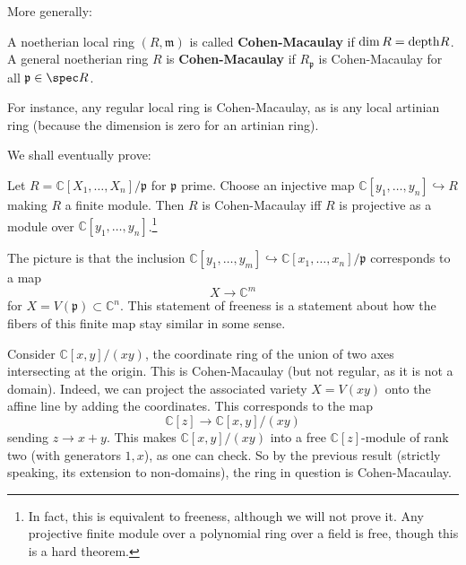More generally:
\begin{definition} 
A noetherian local ring $(R, \mathfrak{m})$ is called \textbf{Cohen-Macaulay}
if $\dim R = \mathrm{depth} R$. A general noetherian ring $R$ is \textbf{Cohen-Macaulay} if
$R_{\mathfrak{p}}$ is Cohen-Macaulay for all $\mathfrak{p} \in \spec R$.
\end{definition} 
For instance, any regular local ring is Cohen-Macaulay, as is any local
artinian ring (because the dimension is zero for an artinian ring).

We shall eventually prove:

\begin{proposition} 
Let $R = \mathbb{C}[X_1, \dots, X_n]/\mathfrak{p}$ for $\mathfrak{p}$ prime.
Choose an injective map $\mathbb{C}[y_1, \dots, y_n] \hookrightarrow R$ making $R$ a
finite module. Then $R$ is Cohen-Macaulay iff $R$ is projective as a module
over $\mathbb{C}[y_1, \dots, y_n]$.\footnote{In fact, this is equivalent to
freeness, although we will not prove it. Any projective finite module over a
polynomial ring over a field is free, though this is a hard theorem.}
\end{proposition} 

The picture is that the inclusion $\mathbb{C}[y_1, \dots, y_m ] \hookrightarrow
\mathbb{C}[x_1, \dots, x_n]/\mathfrak{p}$ corresponds to a map 
\[ X \to \mathbb{C}^m  \]
for $X = V(\mathfrak{p}) \subset \mathbb{C}^n$. This statement of freeness is a
statement about how the fibers of this finite map stay similar in some sense.

\begin{example} 
Consider $\mathbb{C}[x,y]/(xy)$, the coordinate ring of the union of two axes
intersecting at the origin. This is Cohen-Macaulay (but not regular, as it
is not a domain). Indeed, we can project the associated variety $X = V(xy)$
onto the affine line by adding the coordinates. This corresponds to the map
\[ \mathbb{C}[z] \to \mathbb{C}[x,y]/(xy)  \]
sending $z \to x+y$. This makes $\mathbb{C}[x,y]/(xy)$ into a free
$\mathbb{C}[z]$-module of rank two (with generators $1, x$), as one can check.
So by the previous result (strictly speaking, its extension to non-domains),
the ring in question is Cohen-Macaulay.
\end{example} 

